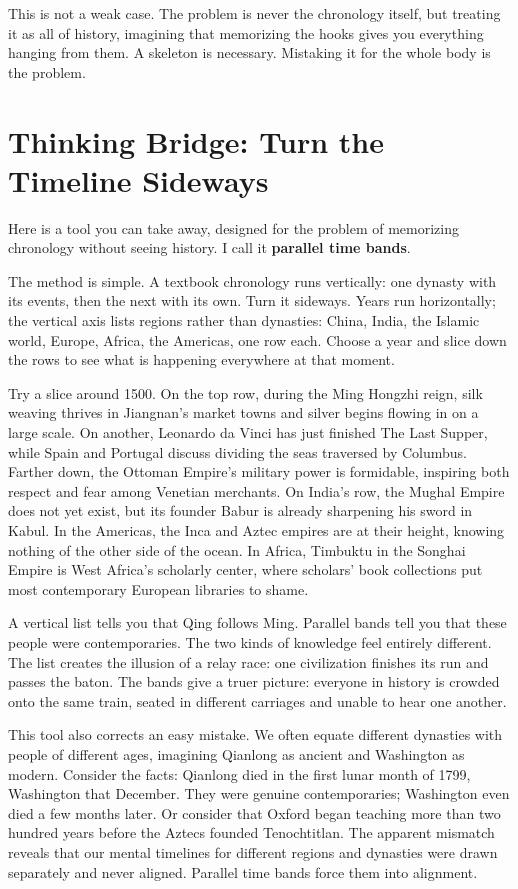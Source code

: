 This is not a weak case. The problem is never the chronology itself, but treating it as all of history, imagining that memorizing the hooks gives you everything hanging from them. A skeleton is necessary. Mistaking it for the whole body is the problem.

\section{Thinking Bridge: Turn the Timeline Sideways}
Here is a tool you can take away, designed for the problem of memorizing chronology without seeing history. I call it \textbf{parallel time bands}.

The method is simple. A textbook chronology runs vertically: one dynasty with its events, then the next with its own. Turn it sideways. Years run horizontally; the vertical axis lists regions rather than dynasties: China, India, the Islamic world, Europe, Africa, the Americas, one row each. Choose a year and slice down the rows to see what is happening everywhere at that moment.

Try a slice around 1500. On the top row, during the Ming Hongzhi reign, silk weaving thrives in Jiangnan's market towns and silver begins flowing in on a large scale. On another, Leonardo da Vinci has just finished The Last Supper, while Spain and Portugal discuss dividing the seas traversed by Columbus. Farther down, the Ottoman Empire's military power is formidable, inspiring both respect and fear among Venetian merchants. On India's row, the Mughal Empire does not yet exist, but its founder Babur is already sharpening his sword in Kabul. In the Americas, the Inca and Aztec empires are at their height, knowing nothing of the other side of the ocean. In Africa, Timbuktu in the Songhai Empire is West Africa's scholarly center, where scholars' book collections put most contemporary European libraries to shame.

A vertical list tells you that Qing follows Ming. Parallel bands tell you that these people were contemporaries. The two kinds of knowledge feel entirely different. The list creates the illusion of a relay race: one civilization finishes its run and passes the baton. The bands give a truer picture: everyone in history is crowded onto the same train, seated in different carriages and unable to hear one another.

This tool also corrects an easy mistake. We often equate different dynasties with people of different ages, imagining Qianlong as ancient and Washington as modern. Consider the facts: Qianlong died in the first lunar month of 1799, Washington that December. They were genuine contemporaries; Washington even died a few months later. Or consider that Oxford began teaching more than two hundred years before the Aztecs founded Tenochtitlan. The apparent mismatch reveals that our mental timelines for different regions and dynasties were drawn separately and never aligned. Parallel time bands force them into alignment.

